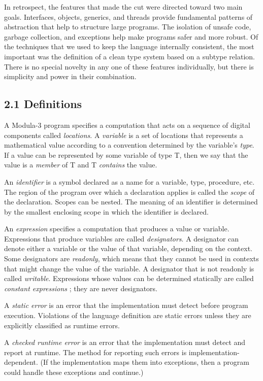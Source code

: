 \documentclass[10pt]{article}
\begin{document}
In retrospect, the features that made the cut were directed toward two main
goals.  Interfaces, objects, generics, and threads provide fundamental
patterns of abstraction that help to structure large programs.  The isolation
of unsafe code, garbage collection, and exceptions help make programs safer
and more robust.  Of the techniques that we used to keep the language
internally consistent, the most important was the definition of a clean type
system based on a subtype relation.  There is no special novelty in any one of
these features individually, but there is simplicity and power in their
combination.

\subsection*{2.1 Definitions}

A Modula-3 program specifies a computation that acts on a sequence of digital
components called \emph{locations}.  A \emph{variable} is a set of locations
that represents a mathematical value according to a convention determined by
the variable's \emph{type}.  If a value can be represented by some variable of
type T, then we say that the value is a \emph{member} of T and T
\emph{contains} the value.

An \emph{identifier} is a symbol declared as a name for a variable, type,
procedure, etc.  The region of the program over which a declaration applies is
called the \emph{scope} of the declaration.  Scopes can be nested.  The
meaning of an identifier is determined by the smallest enclosing scope in
which the identifier is declared.

An \emph{expression} specifies a computation that produces a value or
variable.  Expressions that produce variables are called \emph{designators}.
A designator can denote either a variable or the value of that variable,
depending on the context.  Some designators are \emph{readonly}, which means
that they cannot be used in contexts that might change the value of the
variable.  A designator that is not readonly is called \emph{writable}.
Expressions whose values can be determined statically are called
\emph{constant expressions} ; they are never designators.

A \emph{static error} is an error that the implementation must detect before
program execution.  Violations of the language definition are static errors
unless they are explicitly classified as runtime errors.

A \emph{checked runtime error} is an error that the implementation must detect
and report at runtime.  The method for reporting such errors is
implementation-dependent.  (If the implementation maps them into exceptions,
then a program could handle these exceptions and continue.)
\end{document}
